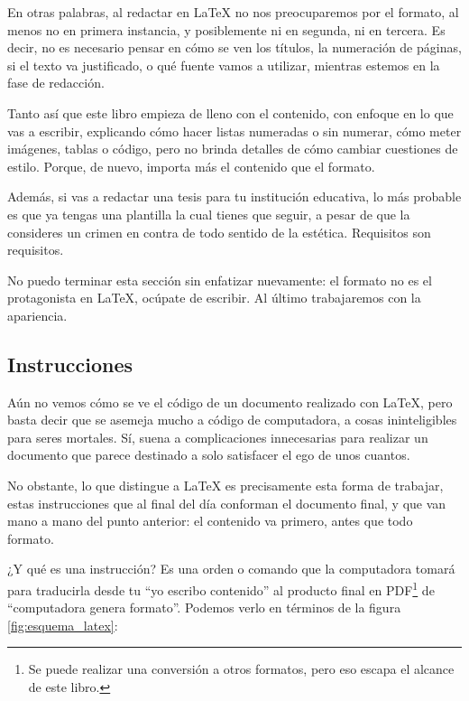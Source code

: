 En otras palabras, al redactar en \LaTeX{} no nos preocuparemos por el formato, al menos no en primera instancia, y posiblemente ni en segunda, ni en tercera. Es decir, no es necesario pensar en cómo se ven los títulos, la numeración de páginas, si el texto va justificado, o qué fuente vamos a utilizar, mientras estemos en la fase de redacción.

Tanto así que este libro empieza de lleno con el contenido, con enfoque en lo que vas a escribir, explicando cómo hacer listas numeradas o sin numerar, cómo meter imágenes, tablas o código, pero no brinda detalles de cómo cambiar cuestiones de estilo. Porque, de nuevo, importa más el contenido que el formato.

Además, si vas a redactar una tesis para tu institución educativa, lo más probable es que ya tengas una plantilla la cual tienes que seguir, a pesar de que la consideres un crimen en contra de todo sentido de la estética. Requisitos son requisitos.

No puedo terminar esta sección sin enfatizar nuevamente: el formato no es el protagonista en \LaTeX{}, ocúpate de escribir. Al último trabajaremos con la apariencia.



\subsection{Instrucciones}
\label{ssub:instrucciones}



Aún no vemos cómo se ve el código de un documento realizado con \LaTeX, pero basta decir que se asemeja mucho a código de computadora, a cosas ininteligibles para seres mortales. Sí, suena a complicaciones innecesarias para realizar un documento que parece destinado a solo satisfacer el ego de unos cuantos.

No obstante, lo que distingue a \LaTeX{} es precisamente esta forma de trabajar, estas instrucciones que al final del día conforman el documento final, y que van mano a mano del punto anterior: el contenido va primero, antes que todo formato.

¿Y qué es una instrucción? Es una orden o comando que la computadora tomará para traducirla desde tu ``yo escribo contenido'' al producto final en PDF\footnote{Se puede realizar una conversión a otros formatos, pero eso escapa el alcance de este libro.} de ``computadora genera formato''. Podemos verlo en términos de la figura \ref{fig:esquema_latex}:

